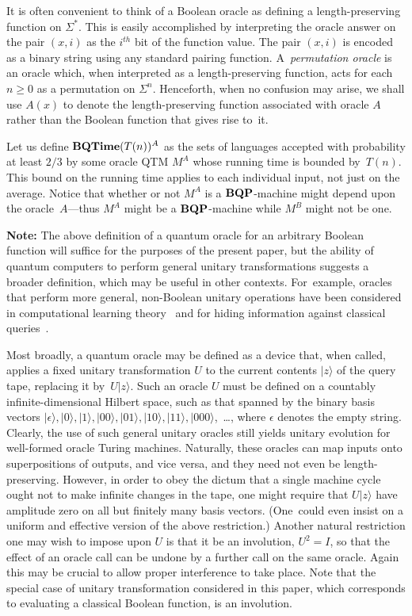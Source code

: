 It is often convenient to think of a Boolean oracle as defining
a length-preserving function on $\Sigma^*$.
This is easily accomplished by interpreting the oracle answer
on the pair $(x, i)$ as the $i^{th}$ bit of the function value.
The pair $(x, i)$ is encoded as a binary string using any
standard pairing function.  A~{\em permutation oracle\/} is
an oracle which, when interpreted as a length-preserving function, acts
for each $n \geq 0$ as a permutation on $\Sigma^n$.
Henceforth, when no confusion may arise, we shall use $A(x)$ to denote the
length-preserving function associated with oracle $A$
rather than the Boolean function that gives rise to~it.

Let us define $\mbox{\bf BQTime}(T(n))^A$ as the sets of languages accepted
with probability at least $2/3$ by some oracle QTM $M^A$ whose
running time is bounded by~$T(n)$.
This bound on the running time applies to each individual input,
not just on the average.
Notice that whether or not $M^A$ is
a $\mbox{\bf BQP}$-machine might depend upon the oracle~$A$---thus $M^A$ might
be a $\mbox{\bf BQP}$-machine while $M^{B}$ might not be one.

\noindent
{\bf Note:}
The above definition of a quantum oracle for an arbitrary Boolean function
will suffice for the purposes of the present paper, but the ability of
quantum computers to perform general unitary transformations suggests a
broader definition, which may be useful in other contexts.
For~example, oracles that perform more general, non-Boolean unitary
operations have been considered in computational learning
theory~\cite{COLT} and for hiding information against classical
queries~\cite{machta}.

Most broadly, a quantum oracle may be defined as a device that,
when called, applies a fixed unitary transformation $U$ to the
current contents $|z\rangle$ of the query tape, replacing it
by~$U|z\rangle$.  Such an oracle $U$ must be
defined on a countably infinite-dimensional Hilbert space, such as that
spanned by the binary basis vectors $|\epsilon\rangle, |0\rangle, |1\rangle,
|00\rangle, |01\rangle, |10\rangle, |11\rangle, |000\rangle$,~\ldots, where
$\epsilon$ denotes the empty string.
Clearly, the use of such general unitary oracles still yields unitary
evolution for well-formed oracle Turing machines.
Naturally, these oracles
can map inputs onto superpositions of outputs, and vice
versa, and they need not even be length-preserving.  However, in order to
obey the dictum that a single machine cycle ought not to make
infinite changes in the tape, one might require that
$U|z\rangle$ have amplitude zero on all but finitely many basis vectors.
(One~could even insist on a uniform and effective version of the
above restriction.)
Another natural restriction one may wish to impose upon $U$ is that
it be an involution, \mbox{$U^2=I$}, so that the effect of an oracle
call can be undone by a further call on the same oracle.  Again this
may be crucial to allow proper interference to take place.
Note that the special case of unitary transformation considered in this
paper, which corresponds to evaluating a classical Boolean function,
is an involution.

